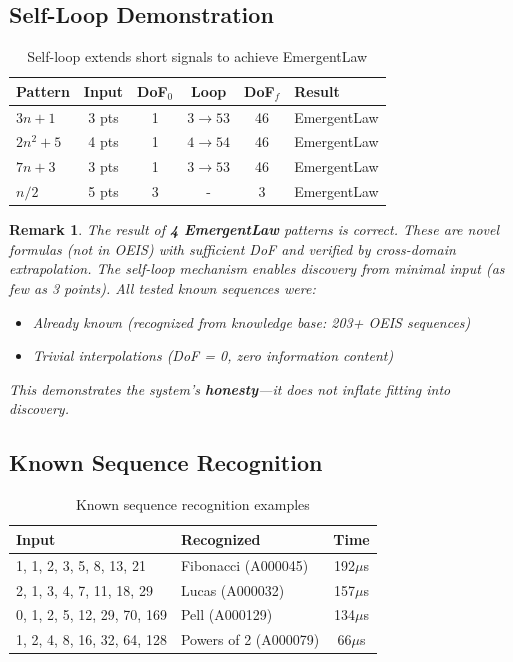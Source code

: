 \documentclass[11pt,a4paper]{article}
\newtheorem{remark}{Remark}
\begin{document}
\subsection{Self-Loop Demonstration}

\begin{table}[h]
\centering
\begin{tabular}{|l|c|c|c|c|l|}
\hline
\textbf{Pattern} & \textbf{Input} & \textbf{DoF$_0$} & \textbf{Loop} & \textbf{DoF$_f$} & \textbf{Result} \\
\hline
$3n+1$ & 3 pts & 1 & $3 \to 53$ & 46 & EmergentLaw \\
$2n^2+5$ & 4 pts & 1 & $4 \to 54$ & 46 & EmergentLaw \\
$7n+3$ & 3 pts & 1 & $3 \to 53$ & 46 & EmergentLaw \\
$n/2$ & 5 pts & 3 & - & 3 & EmergentLaw \\
\hline
\end{tabular}
\caption{Self-loop extends short signals to achieve EmergentLaw}
\end{table}

\begin{remark}
The result of \textbf{4 EmergentLaw} patterns is \emph{correct}. These are novel formulas (not in OEIS) with sufficient DoF and verified by cross-domain extrapolation. The self-loop mechanism enables discovery from minimal input (as few as 3 points). All tested known sequences were:
\begin{itemize}
    \item Already known (recognized from knowledge base: 203+ OEIS sequences)
    \item Trivial interpolations (DoF = 0, zero information content)
\end{itemize}
This demonstrates the system's \textbf{honesty}---it does not inflate fitting into discovery.
\end{remark}

\subsection{Known Sequence Recognition}

\begin{table}[h]
\centering
\begin{tabular}{|l|l|c|}
\hline
\textbf{Input} & \textbf{Recognized} & \textbf{Time} \\
\hline
1, 1, 2, 3, 5, 8, 13, 21 & Fibonacci (A000045) & 192$\mu$s \\
2, 1, 3, 4, 7, 11, 18, 29 & Lucas (A000032) & 157$\mu$s \\
0, 1, 2, 5, 12, 29, 70, 169 & Pell (A000129) & 134$\mu$s \\
1, 2, 4, 8, 16, 32, 64, 128 & Powers of 2 (A000079) & 66$\mu$s \\
\hline
\end{tabular}
\caption{Known sequence recognition examples}
\end{table}
\end{document}
